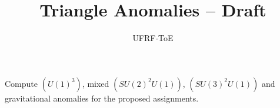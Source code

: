 \documentclass[11pt]{article}
\title{Triangle Anomalies -- Draft}
\author{UFRF‑ToE}
\begin{document}
\maketitle
Compute $(U(1)^3)$, mixed $(SU(2)^2U(1))$, $(SU(3)^2U(1))$ and gravitational anomalies for the proposed assignments.
\end{document}
